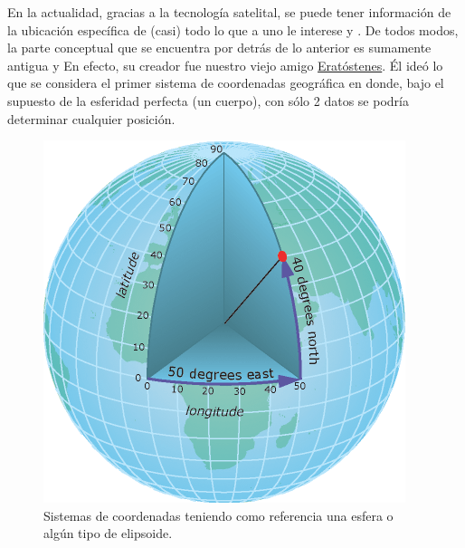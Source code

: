 \documentclass[
  letterpaper,
  DIV=11,
  numbers=noendperiod]{scrreprt}
\begin{document}
\begin{tcolorbox}[enhanced jigsaw, coltitle=black, left=2mm, opacityback=0, colframe=quarto-callout-note-color-frame, bottomrule=.15mm, rightrule=.15mm, breakable, opacitybacktitle=0.6, colbacktitle=quarto-callout-note-color!10!white, titlerule=0mm, toptitle=1mm, bottomtitle=1mm, title=\textcolor{quarto-callout-note-color}{\faInfo}\hspace{0.5em}{Los mapas en la historia}, arc=.35mm, toprule=.15mm, leftrule=.75mm, colback=white]

En la actualidad, gracias a la tecnología satelital, se puede tener
información de la ubicación específica de (casi) todo lo que a uno le
interese y . De todos modos, la parte conceptual que se encuentra por
detrás de lo anterior es sumamente antigua y En efecto, su creador fue
nuestro viejo amigo
\href{https://diegoteca.com.ar/metodocuanti/?p=188}{Eratóstenes}. Él
ideó lo que se considera el primer sistema de coordenadas geográfica en
donde, bajo el supuesto de la esferidad perfecta (un cuerpo), con sólo 2
datos se podría determinar cualquier posición.

\begin{figure}[H]

{\centering \includegraphics{./Inputs/Images/coordenadas.png}

}

\caption{Sistemas de coordenadas teniendo como referencia una esfera o
algún tipo de elipsoide.}

\end{figure}


\end{tcolorbox}
\end{document}
